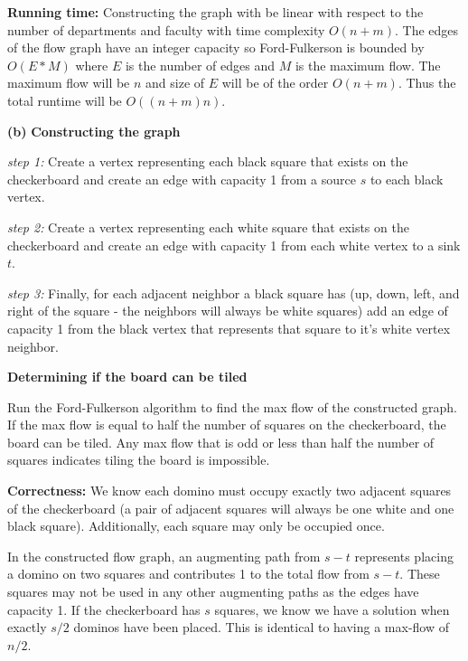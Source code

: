 \documentclass[11pt]{article}
\renewcommand\part[1]{\vspace{.10in}\textbf{(#1)}}
\newcommand\correctness{\vspace{.10in}\textbf{Correctness: }}
\newcommand\runtime{\vspace{.10in}\textbf{Running time: }}
\begin{document}
\runtime Constructing the graph with be linear with respect to the number of departments and faculty with time complexity $O(n + m)$. The edges of the flow graph have an integer capacity so Ford-Fulkerson is bounded by $O(E * M)$ where $E$ is the number of edges and $M$ is the maximum flow. The maximum flow will be $n$ and size of $E$ will be of the order $O(n + m)$. Thus the total runtime will be $O((n + m)n)$.


\part{b} \textbf{Constructing the graph} 

\textit{step 1:} Create a vertex representing each black square that exists on the checkerboard and create an edge with capacity 1 from a source $s$ to each black vertex.

\textit{step 2:} Create a vertex representing each white square that exists on the checkerboard and create an edge with capacity 1 from each white vertex to a sink $t$.

\textit{step 3:} Finally, for each adjacent neighbor a black square has (up, down, left, and right of the square - the neighbors will always be white squares) add an edge of capacity 1 from the black vertex that represents that square to it's white vertex neighbor.

\textbf{Determining if the board can be tiled} 

Run the Ford-Fulkerson algorithm to find the max flow of the constructed graph. If the max flow is equal to half the number of squares on the checkerboard, the board can be tiled. Any max flow that is odd or less than half the number of squares indicates tiling the board is impossible.

\correctness We know each domino must occupy exactly two adjacent squares of the checkerboard (a pair of adjacent squares will always be one white and one black square). Additionally, each square may only be occupied once.

	In the constructed flow graph, an augmenting path from $s-t$ represents placing a domino on two squares and contributes 1 to the total flow from $s-t$. These squares may not be used in any other augmenting paths as the edges have capacity 1. If the checkerboard has $s$ squares, we know we have a solution when exactly $s/2$ dominos have been placed. This is identical to having a max-flow of $n/2$.
\end{document}
